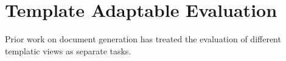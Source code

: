 

\section{Template Adaptable Evaluation}\label{sec:eval-metric}

Prior work on document generation has treated the evaluation of different templatic views as separate tasks.
